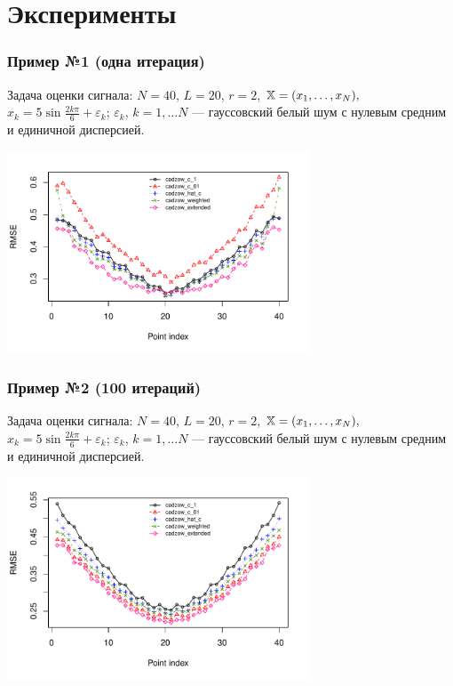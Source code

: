 \documentclass[unicode, notheorems]{beamer}
\begin{document}
\section{Эксперименты}
\begin{frame}
	\frametitle{Пример №1 (одна итерация)}
	Задача оценки сигнала: $N = 40$, $L = 20$, $r = 2$, $\mathbb{X} = (x_{1}, \ldots, x_N),$  $x_k = 5\sin{\frac{2 k \pi}{6}} + \varepsilon_k$; $\varepsilon_k$, $k = 1, \ldots N$ --- гауссовский белый шум с нулевым средним и единичной дисперсией.
	\vspace{-0.3cm}
	\begin{center}
		\includegraphics*[width = 9cm]{s1_it1.pdf}
	\end{center}
\end{frame}

\begin{frame}
	\frametitle{Пример №2 (100 итераций)}
	Задача оценки сигнала: $N = 40$, $L = 20$, $r = 2$, $\mathbb{X} = (x_{1}, \ldots, x_N),$  $x_k = 5\sin{\frac{2 k \pi}{6}} + \varepsilon_k$; $\varepsilon_k$, $k = 1, \ldots N$ --- гауссовский белый шум с нулевым средним и единичной дисперсией.
	\vspace{-0.3cm}
	
	\begin{center}
		\includegraphics*[width = 9cm]{s1_it100.pdf}
	\end{center}
\end{frame}
\end{document}

